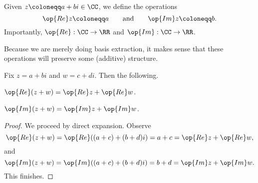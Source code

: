 \begin{definition}
	Given $z\coloneqq a+bi\in\CC$, we define the operations
	\[\op{Re}z\coloneqq a\qquad\text{and}\qquad\op{Im}z\coloneqq b.\]
	Importantly, $\op{Re}:\CC\to\RR$ and $\op{Im}:\CC\to\RR$.
\end{definition}
Because we are merely doing basis extraction, it makes sense that these operations will preserve some (additive) structure.
\begin{proposition}
	Fix $z=a+bi$ and $w=c+di$. Then the following.
	\begin{listalph}
		\item $\op{Re}(z+w)=\op{Re}z+\op{Re}w$.
		\item $\op{Im}(z+w)=\op{Im}z+\op{Im}w$.
	\end{listalph}
\end{proposition}
\begin{proof}
	We proceed by direct expansion. Observe
	\[\op{Re}(z+w)=\op{Re}((a+c)+(b+d)i)=a+c=\op{Re}z+\op{Re}w,\]
	and
	\[\op{Im}(z+w)=\op{Im}((a+c)+(b+d)i)=b+d=\op{Im}z+\op{Im}w.\]
	This finishes.
\end{proof}

